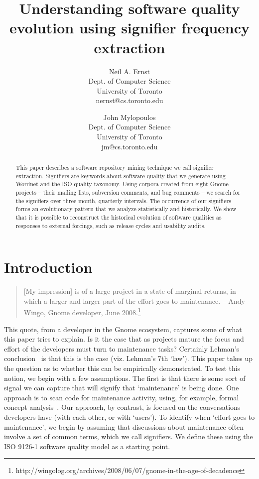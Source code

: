 \documentclass[conference, compsoc]{IEEEtran}
\begin{document}

 
\title{Understanding software quality evolution using signifier frequency extraction}
\author{
Neil A. Ernst\\Dept. of Computer Science\\University of Toronto\\nernst@cs.toronto.edu \and
John Mylopoulos\\Dept. of Computer Science\\University of Toronto\\jm@cs.toronto.edu }

\maketitle

\begin{abstract}
This paper describes a software repository mining technique we call signifier extraction. Signifiers are keywords about software quality that we generate using Wordnet and the ISO quality taxonomy. Using corpora created from eight Gnome projects -- their mailing lists, subversion comments, and bug comments -- we search for the signifiers over three month, quarterly intervals. The occurrence of our signifiers forms an evolutionary pattern that we analyze statistically and historically. We show that it is possible to reconstruct the historical evolution of software qualities as responses to external forcings, such as release cycles and usability audits. %
\end{abstract}

\section{Introduction}\label{sect:introduction}%
\begin{quote}[My impression] is of a large project in a state of marginal returns, in which a larger and larger part of the effort goes to maintenance. -- Andy Wingo, Gnome developer, June 2008.\footnote{http://wingolog.org/archives/2008/06/07/gnome-in-the-age-of-decadence}\end{quote}
	This quote, from a developer in the Gnome ecosystem, captures some of what this paper tries to explain. Is it the case that as projects mature the focus and effort of the developers must turn to maintenance tasks\cite{Swanson1976}? Certainly Lehman's conclusion~\cite{lehman_software_2006} is that this is the case (viz. Lehman's 7th `law'). This paper takes up the question as to whether this can be empirically demonstrated. To test this notion, we begin with a few assumptions. The first is that there is some sort of signal we can capture that will signify that `maintenance' is being done. One approach is to scan code for maintenance activity, using, for example, formal concept analysis~\cite{breu06msr}. Our approach, by contrast, is focused on the conversations developers have (with each other, or with `users'). To identify when `effort goes to maintenance', we begin by assuming that discussions about maintenance often involve a set of common terms, which we call signifiers. We define these using the ISO 9126-1 software quality model \cite{iso9126} as a starting point. 
\end{document}
